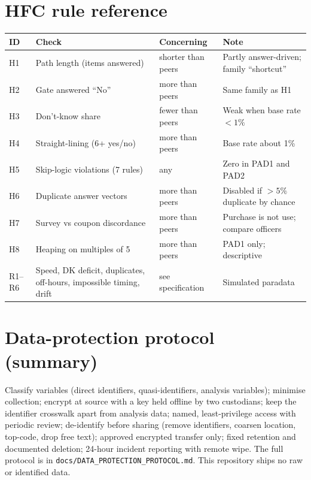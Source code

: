\documentclass[11pt,a4paper]{article}
\begin{document}
\section{HFC rule reference}\label{app:hfc}
\small\setlength{\tabcolsep}{4pt}
\begin{tabular}{p{1.1cm}p{4.0cm}p{2.7cm}p{6cm}}\toprule ID & Check & Concerning & Note\\\midrule
H1 & Path length (items answered) & shorter than peers & Partly answer-driven; family ``shortcut''\\
H2 & Gate answered ``No'' & more than peers & Same family as H1\\
H3 & Don't-know share & fewer than peers & Weak when base rate $<1\%$\\
H4 & Straight-lining (6+ yes/no) & more than peers & Base rate about 1\%\\
H5 & Skip-logic violations (7 rules) & any & Zero in PAD1 and PAD2\\
H6 & Duplicate answer vectors & more than peers & Disabled if $>5\%$ duplicate by chance\\
H7 & Survey vs coupon discordance & more than peers & Purchase is not use; compare officers\\
H8 & Heaping on multiples of 5 & more than peers & PAD1 only; descriptive\\
R1--R6 & Speed, DK deficit, duplicates, off-hours, impossible timing, drift & see specification & Simulated paradata\\\bottomrule\end{tabular}
\normalsize

\section{Data-protection protocol (summary)}\label{app:dp}
Classify variables (direct identifiers, quasi-identifiers, analysis variables); minimise collection; encrypt at source with a key held offline by two custodians; keep the identifier crosswalk apart from analysis data; named, least-privilege access with periodic review; de-identify before sharing (remove identifiers, coarsen location, top-code, drop free text); approved encrypted transfer only; fixed retention and documented deletion; 24-hour incident reporting with remote wipe. The full protocol is in \texttt{docs/DATA\_PROTECTION\_PROTOCOL.md}. This repository ships no raw or identified data.
\end{document}
